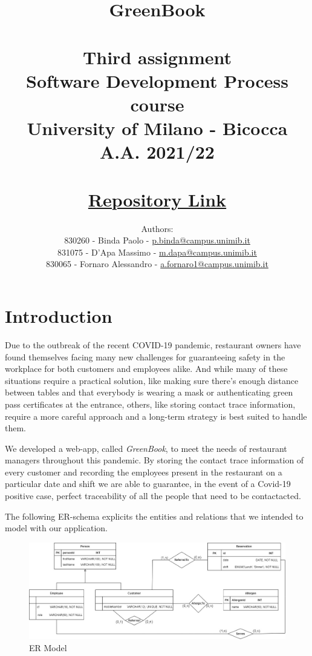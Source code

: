 \documentclass{article}
\title{\textbf{GreenBook}\\~\\
    Third assignment\\
    \small Software Development Process course\\
        University of Milano - Bicocca\\
        A.A. 2021/22\\~\\
        \href{https://gitlab.com/massimino96/2021_assignment3_greenbook/}{Repository Link}}
\author{Authors:\\
    830260 - Binda Paolo - \href{mailto:p.binda@campus.unimib.it}{p.binda@campus.unimib.it}\\
    831075 - D'Apa Massimo - \href{mailto:m.dapa@campus.unimib.it}{m.dapa@campus.unimib.it}\\
    830065 - Fornaro Alessandro - \href{mailto:a.fornaro1@campus.unimib.it}{a.fornaro1@campus.unimib.it}}
\date{}
\begin{document}
\setlength{\parindent}{0em}
\setlength{\parskip}{1em}

\maketitle
\thispagestyle{empty}

\cleardoublepage
\setcounter{page}{1}

\section*{Introduction}

Due to the outbreak of the recent COVID-19 pandemic, restaurant owners have found
themselves facing many new challenges for guaranteeing safety in the workplace for both
customers and employees alike. And while many of these situations require a practical
solution, like making sure there's enough distance between tables and that everybody
is wearing a mask or authenticating green pass certificates at the entrance, others, like
storing contact trace information, require a more careful approach and a long-term
strategy is best suited to handle them.


We developed a web-app, called \textit{GreenBook}, to meet the needs of restaurant 
managers throughout this pandemic. By storing the contact trace information of every 
customer and recording the employees present in the restaurant on a particular 
date and shift we are able to guarantee, in the event of a Covid-19 positive case,
perfect traceability of all the people that need to be contactacted.


The following ER-schema explicits the entities and relations that we intended
to model with our application.

\vspace{5mm}
\begin{figure}[H]
    \centering
    \includegraphics[width=\textwidth]{ER}
    \caption{ER Model}
    \label{fig:ermodel}
\end{figure}
\end{document}
